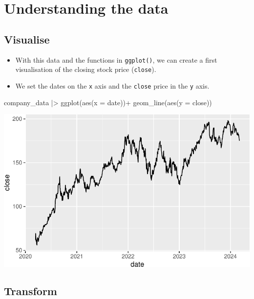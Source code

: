 \documentclass[
  letterpaper,
  DIV=11,
  numbers=noendperiod]{scrreprt}
\newenvironment{Shaded}{\begin{snugshade}}{\end{snugshade}}
\newcommand{\AttributeTok}[1]{\textcolor[rgb]{0.40,0.45,0.13}{#1}}
\newcommand{\FunctionTok}[1]{\textcolor[rgb]{0.28,0.35,0.67}{#1}}
\newcommand{\NormalTok}[1]{\textcolor[rgb]{0.00,0.23,0.31}{#1}}
\newcommand{\SpecialCharTok}[1]{\textcolor[rgb]{0.37,0.37,0.37}{#1}}
\theoremstyle{definition}
\theoremstyle{remark}
\begin{document}

\chapter{Understanding the data}\label{understanding-the-data}

\section{Visualise}\label{visualise}

\begin{itemize}
\item
  With this data and the functions in \texttt{ggplot()}, we can create a
  first visualisation of the closing stock price (\texttt{close}).
\item
  We set the dates on the \texttt{x} axis and the \texttt{close} price
  in the \texttt{y} axis.
\end{itemize}

\begin{Shaded}
\begin{Highlighting}[]
\NormalTok{company\_data }\SpecialCharTok{|\textgreater{}} 
  \FunctionTok{ggplot}\NormalTok{(}\FunctionTok{aes}\NormalTok{(}\AttributeTok{x =}\NormalTok{ date))}\SpecialCharTok{+}
  \FunctionTok{geom\_line}\NormalTok{(}\FunctionTok{aes}\NormalTok{(}\AttributeTok{y =}\NormalTok{ close)) }
\end{Highlighting}
\end{Shaded}

\includegraphics{03-understanding_files/figure-pdf/unnamed-chunk-2-1.pdf}

\section{Transform}\label{transform}
\end{document}
